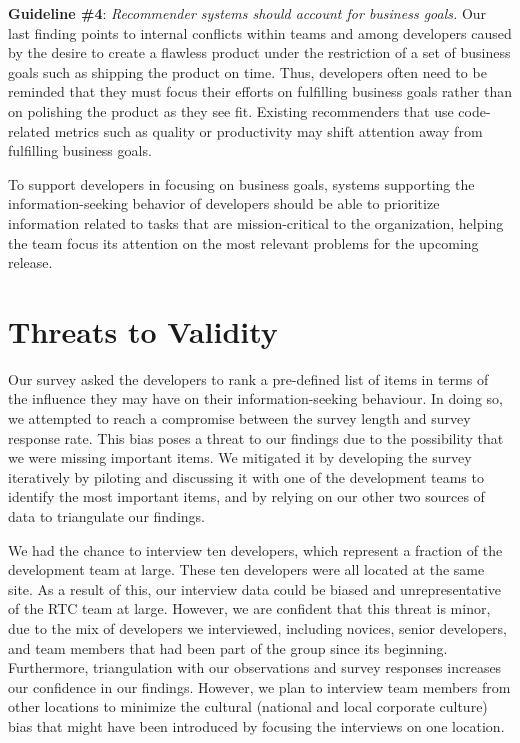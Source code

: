 \textbf{Guideline \#4}: \emph{Recommender systems should account for business goals.}
Our last finding points to internal conflicts within teams and among developers caused by the desire to create a flawless product under the restriction of a set of business goals such as shipping the product on time.
Thus, developers often need to be reminded that they must focus their efforts on fulfilling business goals rather than on polishing the product as they see fit. Existing recommenders that use code-related metrics such as quality or productivity may shift attention away from fulfilling business goals.


To support developers in focusing on business goals, systems supporting the information-seeking behavior of developers should be able to prioritize information related to tasks that are mission-critical to the organization, helping the team focus its attention on the most relevant problems for the upcoming release.



\section{Threats to Validity}
\label{sec:threats}

Our survey asked the developers to rank a pre-defined list of items in
terms of the influence they may have on their information-seeking behaviour.
In doing so, we attempted to reach a compromise between the survey length and
survey response rate. 
This bias poses a threat to our findings due to the possibility that we were missing important items.
We mitigated it by developing the survey iteratively by piloting and discussing it with one of the development teams to identify the most important items, and by relying on our other two sources of data to triangulate our findings.

We had the chance to interview ten developers, which represent a fraction of the development team at large. These ten developers were all located at the same site. As a result of this, our interview data could be biased and unrepresentative of the RTC team at large.
However, we are confident that this threat is minor, due to the mix of developers we interviewed, including novices, senior developers, and team members that had been part of the group since its beginning.
Furthermore, triangulation with our observations and survey responses increases our confidence in our findings.
However, we plan to interview team members from other locations to minimize the cultural (national and local corporate culture) bias that might have been introduced by focusing the interviews on one location. 

